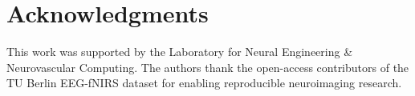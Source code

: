 \documentclass[final,5p,times,twocolumn]{elsarticle}
\begin{document}
\section*{Acknowledgments}
This work was supported by the Laboratory for Neural Engineering \& Neurovascular Computing. The authors thank the open-access contributors of the TU Berlin EEG-fNIRS dataset for enabling reproducible neuroimaging research.



\end{document}
